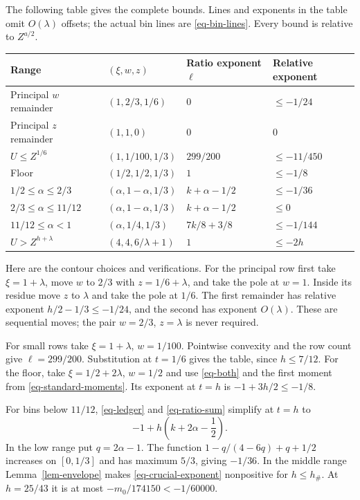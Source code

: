 \documentclass[11pt,a4paper]{article}
\numberwithin{equation}{section}
\theoremstyle{remark}
\begin{document}
The following table gives the complete bounds.  Lines and exponents
in the table omit $O(\lambda)$ offsets; the actual bin lines are
\eqref{eq-bin-lines}.  Every bound is relative to $Z^{a/2}$.
\begin{center}
\small
\begin{tabular}{@{}llll@{}}
\toprule
Range & $(\xi,w,z)$ & Ratio exponent $\ell$ & Relative exponent\\
\midrule
Principal $w$ remainder & $(1,2/3,1/6)$ & $0$ & $\le-1/24$\\
Principal $z$ remainder & $(1,1,0)$ & $0$ & $0$\\
$U\le Z^{1/6}$ & $(1,1/100,1/3)$ & $299/200$ & $\le-11/450$\\
Floor & $(1/2,1/2,1/3)$ & $1$ & $\le-1/8$\\
$1/2\le\alpha\le2/3$ & $(\alpha,1-\alpha,1/3)$ & $k+\alpha-1/2$ & $\le-1/36$\\
$2/3\le\alpha\le11/12$ & $(\alpha,1-\alpha,1/3)$ & $k+\alpha-1/2$ & $\le0$\\
$11/12\le\alpha<1$ & $(\alpha,1/4,1/3)$ & $7k/8+3/8$ & $\le-1/144$\\
$U>Z^{h+\lambda}$ & $(4,4,6/\lambda+1)$ & $1$ & $\le-2h$\\
\bottomrule
\end{tabular}
\end{center}

Here are the contour choices and verifications.  For the principal
row first take $\xi=1+\lambda$, move $w$ to $2/3$ with
$z=1/6+\lambda$, and take the pole at $w=1$.  Inside its residue
move $z$ to $\lambda$ and take the pole at $1/6$.  The first
remainder has relative exponent $h/2-1/3\le-1/24$, and the
second has exponent $O(\lambda)$.  These are sequential moves;
the pair $w=2/3$, $z=\lambda$ is never required.

For small rows take $\xi=1+\lambda$, $w=1/100$.  Pointwise
convexity and the row count give $\ell=299/200$.  Substitution
at $t=1/6$ gives the table, since $h\le7/12$.  For the floor,
take $\xi=1/2+2\lambda$, $w=1/2$ and use \eqref{eq-both}
and the first moment from \eqref{eq-standard-moments}.
Its exponent at $t=h$ is $-1+3h/2\le-1/8$.

For bins below $11/12$, \eqref{eq-ledger} and
\eqref{eq-ratio-sum} simplify at $t=h$ to
\begin{equation}\label{eq-crucial-exponent}
 -1+h\left(k+2\alpha-\frac12\right).
\end{equation}
In the low range put $q=2\alpha-1$.  The function
$1-q/(4-6q)+q+1/2$ increases on $[0,1/3]$ and has maximum
$5/3$, giving $-1/36$.  In the middle range
Lemma~\ref{lem-envelope} makes \eqref{eq-crucial-exponent}
nonpositive for $h\le h_\#$.  At $h=25/43$ it is at most
$-m_0/174150<-1/60000$.
\end{document}
